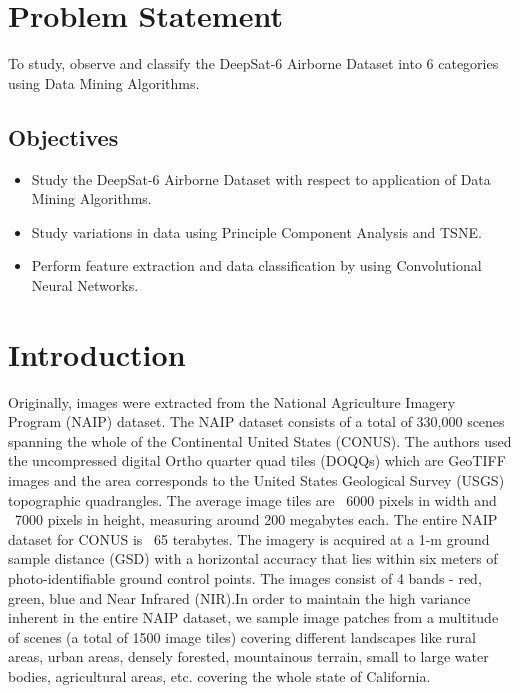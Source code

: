 \documentclass[12pt, letterpaper]{article}
\begin{document}


\tableofcontents
\newpage

\section{Problem Statement}

\hspace*{0.25 in}To study, observe and classify the DeepSat-6 Airborne Dataset into 6 categories using Data Mining Algorithms.

\subsection{Objectives}
\begin{itemize}
	\item Study the DeepSat-6 Airborne Dataset with respect to application of Data Mining Algorithms.
	\item Study variations in data using Principle Component Analysis and TSNE.
	\item Perform feature extraction and data classification by using Convolutional Neural Networks.
\end{itemize}

\newpage
\section{Introduction}
\hspace*{0.25 in}Originally, images were extracted from the National Agriculture Imagery Program (NAIP) dataset. The NAIP dataset consists of a total of 330,000 scenes spanning the whole of the Continental United States (CONUS). The authors used the uncompressed digital Ortho quarter quad tiles (DOQQs) which are GeoTIFF images and the area corresponds to the United States Geological Survey (USGS) topographic quadrangles. The average image tiles are ~6000 pixels in width and ~7000 pixels in height, measuring around 200 megabytes each. The entire NAIP dataset for CONUS is ~65 terabytes. The imagery is acquired at a 1-m ground sample distance (GSD) with a horizontal accuracy that lies within six meters of photo-identifiable ground control points.
\hspace*{0.25 in}The images consist of 4 bands - red, green, blue and Near Infrared (NIR).In order to maintain the high variance inherent in the entire NAIP dataset, we sample image patches from a multitude of scenes (a total of 1500 image tiles) covering different landscapes like rural areas, urban areas, densely forested, mountainous terrain, small to large water bodies, agricultural areas, etc. covering the whole state of California.
\newpage
\end{document}
